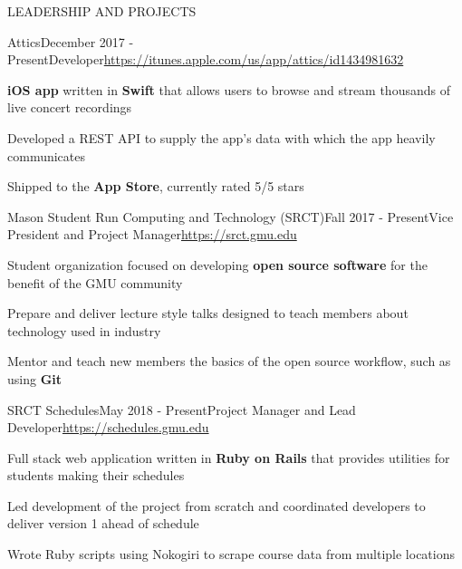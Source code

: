 \documentclass{resume} %
\begin{document}

\begin{rSection}{LEADERSHIP AND PROJECTS}

  \begin{rSubsection}{Attics}{December 2017 - Present}{Developer}{\url{https://itunes.apple.com/us/app/attics/id1434981632}} 

    \item \textbf{iOS app} written in \textbf{Swift} that allows users to browse and stream thousands of live concert recordings
    \item Developed a REST API to supply the app's data with which the app heavily communicates
    \item Shipped to the \textbf{App Store}, currently rated 5/5 stars
    
  \end{rSubsection}

  \begin{rSubsection}{Mason Student Run Computing and Technology (SRCT)}{Fall 2017 - Present}{Vice President and Project Manager}{\url{https://srct.gmu.edu}} 

    \item Student organization focused on developing \textbf{open source software} for the benefit of the GMU community
    \item Prepare and deliver lecture style talks designed to teach members about technology used in industry
    \item Mentor and teach new members the basics of the open source workflow, such as using \textbf{Git}
 
  \end{rSubsection}

  \begin{rSubsection}{SRCT Schedules}{May 2018 - Present}{Project Manager and Lead Developer}{\url{https://schedules.gmu.edu}} 

    \item Full stack web application written in \textbf{Ruby on Rails} that provides utilities for students making their schedules
    \item Led development of the project from scratch and coordinated developers to deliver version 1 ahead of schedule
    \item Wrote Ruby scripts using Nokogiri to scrape course data from multiple locations
    
  \end{rSubsection}

\end{rSection} 
\end{document}
